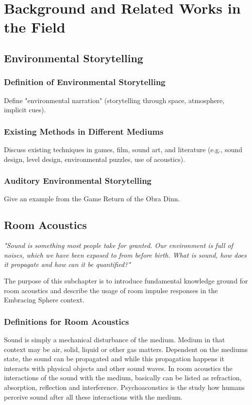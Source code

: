 \chapter{Background and Related Works in the Field}
    \section{Environmental Storytelling}
        \subsection{Definition of Environmental Storytelling} Define "environmental narration" (storytelling through space, atmosphere, implicit cues).
        \subsection{Existing Methods in Different Mediums} Discuss existing techniques in games, film, sound art, and literature (e.g., sound design, level design, environmental puzzles, use of acoustics).
        \subsection{Auditory Environmental Storytelling} Give an example from the Game Return of the Obra Dinn. 
    \section{Room Acoustics}
        \emph{"Sound is something most people take for granted. Our environment is full of noises, which we have been exposed to from before birth. What is sound, how does it propagate and how can it be quantified\cite{Blank}?"}\par 

        The purpose of this subchapter is to introduce fundamental knowledge ground for room acoustics and describe the usage of room impulse responses in the Embracing Sphere context.\par
        \subsection{Definitions for Room Acoustics}
            Sound is simply a mechanical disturbance of the medium. Medium in that context may be air, solid, liquid or other gas matters. Dependent on the mediums state, the sound can be propagated and while this propagation happens it interacts with physical objects and other sound waves. In room acoustics the interactions of the sound with the medium, basically can be listed as refraction, absorption, reflection and interference. Psychoacoustics is the study how humans perceive sound after all these interactions with the medium\cite{Blank}.\par

